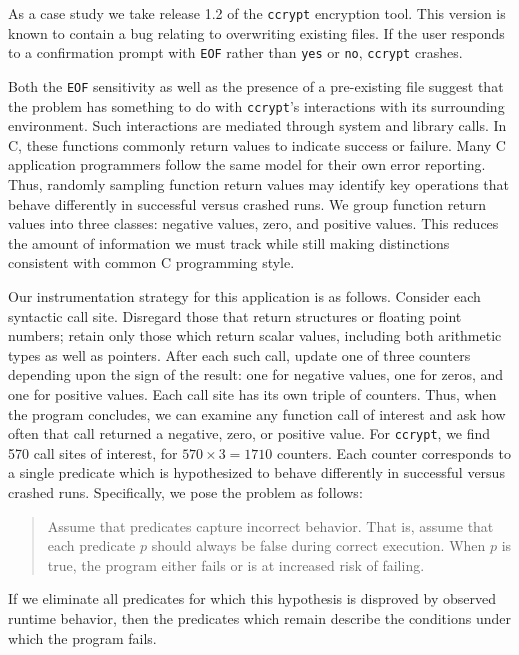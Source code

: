 As a case study we take release 1.2 of the \texttt{ccrypt} encryption
tool.  This version is known to contain a bug relating to overwriting
existing files.  If the user responds to a confirmation prompt with
\texttt{EOF} rather than \texttt{yes} or \texttt{no}, \texttt{ccrypt}
crashes.

Both the \texttt{EOF} sensitivity as well as the presence of a
pre-existing file suggest that the problem has something to do with
\texttt{ccrypt}'s interactions with its surrounding environment.  Such
interactions are mediated through system and library calls.  In C,
these functions commonly return values to indicate success or failure.
Many C application programmers follow the same model for their own
error reporting.  Thus, randomly sampling function return values may
identify key operations that behave differently in successful versus
crashed runs.  We group function return values into three classes:
negative values, zero, and positive values.  This reduces the amount
of information we must track while still making distinctions
consistent with common C programming style.

Our instrumentation strategy for this application is as follows.
Consider each syntactic call site.  Disregard those that return
structures or floating point numbers; retain only those which return
scalar values, including both arithmetic types as well as pointers.
After each such call, update one of three counters depending upon the
sign of the result: one for negative values, one for zeros, and one
for positive values.  Each call site has its own triple of counters.
Thus, when the program concludes, we can examine any function call of
interest and ask how often that call returned a negative, zero, or
positive value.  For
\texttt{ccrypt}, we find 570 call sites of interest, for $570 \times 3 =
1710$ counters.  Each counter corresponds to a single predicate which
is hypothesized to behave differently in successful versus crashed
runs.  Specifically, we pose the problem as follows:

\begin{quote}
  Assume that predicates capture incorrect behavior.  That is, assume
  that each predicate $p$ should always be false during correct
  execution.  When $p$ is true, the program either fails or is at
  increased risk of failing.
\end{quote}

If we eliminate all predicates for which this hypothesis is disproved
by observed runtime behavior, then the predicates which remain
describe the conditions under which the program fails.

